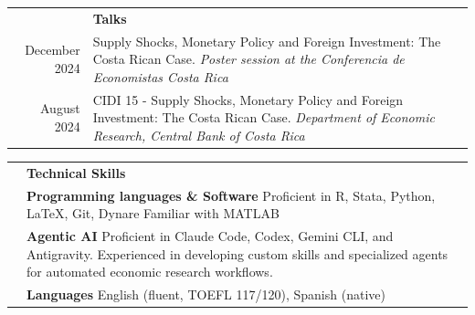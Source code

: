 \documentclass[letterpaper, 11pt]{article}
\newcommand{\headingfont}{\bfseries\Large\color{ChadDarkBlue}}
\newenvironment{SectionTable}[1]{
	\renewcommand*{\arraystretch}{1.7}
	\setlength{\tabcolsep}{10pt}
	\begin{longtable}{Rp{5.2in}} & #1 \\}
{\end{longtable}\vspace{-1cm}}
\begin{document}
\begin{SectionTable}{\headingfont Talks}
December 2024 &
Supply Shocks, Monetary Policy and Foreign Investment: The Costa Rican Case.
\textit{Poster session at the Conferencia de Economistas Costa Rica} \\

August 2024 &
CIDI 15 - Supply Shocks, Monetary Policy and Foreign Investment: The Costa Rican Case.
\textit{Department of Economic Research, Central Bank of Costa Rica}
\end{SectionTable}







\begin{SectionTable}{\headingfont Technical Skills}
& \textbf{Programming languages \& Software} \newline
Proficient in R, Stata, Python, \LaTeX, Git, Dynare  \newline
Familiar with MATLAB \\

& \textbf{Agentic AI} \newline
Proficient in Claude Code, Codex, Gemini CLI, and Antigravity. Experienced in developing custom skills and specialized agents for automated economic research workflows. \\

& \textbf{Languages} \newline
English (fluent, TOEFL 117/120), Spanish (native)
\end{SectionTable}



\end{document}
